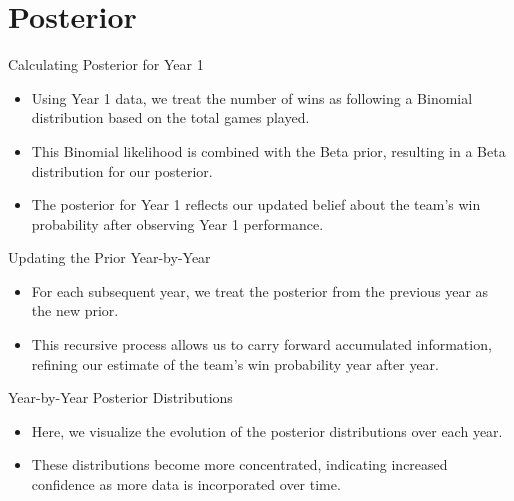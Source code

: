 \section{Posterior}

\begin{frame}{Calculating Posterior for Year 1}

  \begin{itemize}
    \item Using Year 1 data, we treat the number of wins as following a Binomial distribution based on the total games played.
    \item This Binomial likelihood is combined with the Beta prior, resulting in a Beta distribution for our posterior.
    \item The posterior for Year 1 reflects our updated belief about the team’s win probability after observing Year 1 performance.
  \end{itemize}
  
\end{frame}

\begin{frame}{Updating the Prior Year-by-Year}

  \begin{itemize}
    \item For each subsequent year, we treat the posterior from the previous year as the new prior.
    \item This recursive process allows us to carry forward accumulated information, refining our estimate of the team’s win probability year after year.
  \end{itemize}
  
\end{frame}

\begin{frame}{Year-by-Year Posterior Distributions}

  \begin{itemize}
    \item Here, we visualize the evolution of the posterior distributions over each year.
    \item These distributions become more concentrated, indicating increased confidence as more data is incorporated over time.
  \end{itemize}
  
\end{frame}
